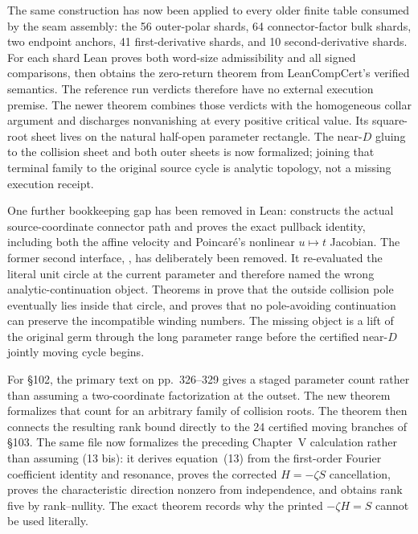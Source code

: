 \documentclass[11pt]{article}
\begin{document}
The same construction has now been applied to every older finite table consumed by the seam
assembly: the 56 outer-polar shards, 64 connector-factor bulk shards, two endpoint anchors,
41 first-derivative shards, and 10 second-derivative shards.  For each shard Lean proves both
word-size admissibility and all signed comparisons, then obtains the zero-return theorem from
LeanCompCert's verified semantics.  The reference run verdicts therefore have no external
execution premise.  The newer theorem
 combines those verdicts with the homogeneous
collar argument and discharges nonvanishing at every positive critical value.  Its square-root
sheet lives on the natural half-open parameter rectangle.  The near-$D$ gluing to the collision
sheet and both outer sheets is now formalized; joining that terminal family to the original
source cycle is analytic topology, not a missing execution receipt.

One further bookkeeping gap has been removed in Lean:
 constructs the actual source-coordinate
connector path and proves the exact pullback identity, including both the affine velocity and
Poincar\'e's nonlinear \(u\mapsto t\) Jacobian.  The former second interface,
, has deliberately been removed.  It re-evaluated the
literal unit circle at the current parameter and therefore named the wrong analytic-continuation
object.  Theorems in  prove that the outside collision pole
eventually lies inside that circle, and  proves that no
pole-avoiding continuation can preserve the incompatible winding numbers.  The missing object is
a lift of the original germ through the long parameter range before the certified near-$D$
jointly moving cycle begins.

For \S102, the primary text on pp.~326--329 gives a staged parameter count rather than assuming a
two-coordinate factorization at the outset.  The new theorem
 formalizes that count for an
arbitrary family of collision roots.  The theorem
 then connects the resulting rank bound directly to the
24 certified moving branches of \S103.  The same file now formalizes the preceding Chapter~V
calculation rather than assuming (13 bis): it derives equation~(13) from the first-order Fourier
coefficient identity and resonance, proves the corrected $H=-\zeta S$ cancellation, proves the
characteristic direction nonzero from independence, and obtains rank five by rank--nullity.  The
exact theorem  records why the printed
$-\zeta H=S$ cannot be used literally.
\end{document}
